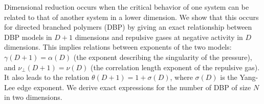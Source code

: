 
Dimensional reduction occurs when the critical behavior of one system can be related to that of another system in a lower dimension. We show that this occurs for directed branched polymers (DBP) by giving an exact relationship between DBP models in $D+1$ dimensions and repulsive gases at negative activity in $D$ dimensions.  This implies relations between exponents of the two models: $\gamma(D+1)=\alpha(D)$ (the exponent describing the singularity of the pressure), and $\nu_{\perp}(D+1)=\nu(D)$ (the correlation length exponent of the repulsive gas). It also leads to the relation $\theta(D+1)=1+\sigma(D)$, where $\sigma(D)$ is the Yang-Lee edge exponent.  We derive exact expressions for the number of DBP of size $N$ in two dimensions.

